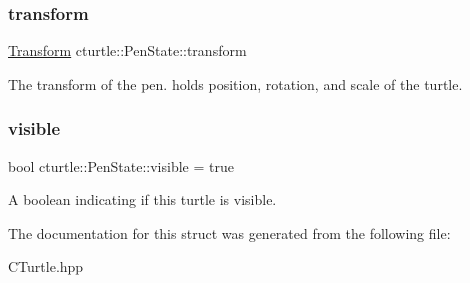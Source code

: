 \subsubsection{\texorpdfstring{transform}{transform}}
{\footnotesize\ttfamily \hyperlink{classcturtle_1_1Transform}{Transform} cturtle\+::\+Pen\+State\+::transform}

The transform of the pen. holds position, rotation, and scale of the turtle. \mbox{\label{structcturtle_1_1PenState_a7c1380e85858e04607427fcddeb1cba7}} 
\subsubsection{\texorpdfstring{visible}{visible}}
{\footnotesize\ttfamily bool cturtle\+::\+Pen\+State\+::visible = true}

A boolean indicating if this turtle is visible. 

The documentation for this struct was generated from the following file\+:\begin{DoxyCompactItemize}
\item 
C\+Turtle.\+hpp\end{DoxyCompactItemize}
